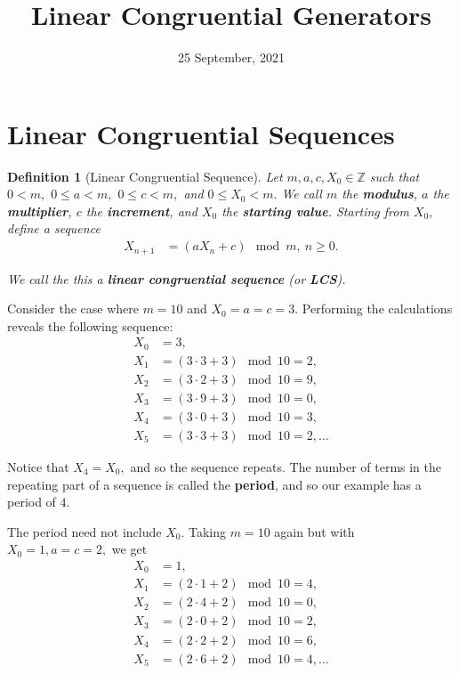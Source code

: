 \documentclass[11pt]{article}
\newcommand{\upright}[1]{{\bf \ttfamily #1}}
\newtheorem{definition}[theorem]{Definition}
\begin{document}
\title{Linear Congruential Generators}
\date{25 September, 2021}
\maketitle

\section{Linear Congruential Sequences}

\begin{definition}[Linear Congruential Sequence]\label{def:lcs}
Let $m, a, c, X_{0} \in \mathbb{Z}$ such that $0 < m,$ $0 \leq a< m,$ $0 \leq c < m,$ and $0 \leq X_{0} < m.$ We call $m$ the {\bf modulus}, $a$ the {\bf multiplier}, $c$ the {\bf increment}, and $X_{0}$ the {\bf starting value}. Starting from $X_{0},$ define a sequence
\begin{align}
\label{eqn:lcs}
X_{n+1} &= \left(a X_{n} + c\right) \mod m,~n\geq 0.
\end{align}

We call the this a {\bf linear congruential sequence} (or \upright{LCS}).
\end{definition}

Consider the case where $m = 10$ and $X_{0} = a = c = 3.$ Performing the calculations reveals the following sequence:
\begin{align*}
X_{0} &= 3,\\
X_{1} &= \left(3 \cdot 3 + 3\right) \mod 10 = 2,\\
X_{2} &= \left(3 \cdot 2 + 3\right) \mod 10 = 9,\\
X_{3} &= \left(3 \cdot 9 + 3\right) \mod 10 = 0,\\
X_{4} &= \left(3 \cdot 0 + 3\right) \mod 10 = 3,\\
X_{5} &= \left(3 \cdot 3 + 3\right) \mod 10 = 2,\ldots
\end{align*}

Notice that $X_{4} = X_{0},$ and so the sequence repeats. The number of terms in the repeating part of a sequence is called the {\bf period}, and so our example has a period of $4$.

The period need not include $X_{0}$. Taking $m = 10$ again but with $X_{0} = 1, a = c = 2,$ we get
\begin{align*}
X_{0} &= 1,\\
X_{1} &= \left(2 \cdot 1 + 2\right) \mod 10 = 4,\\
X_{2} &= \left(2 \cdot 4 + 2\right) \mod 10 = 0,\\
X_{3} &= \left(2 \cdot 0 + 2\right) \mod 10  = 2,\\
X_{4} &= \left(2 \cdot 2 + 2\right) \mod 10  = 6,\\
X_{5} &= \left(2 \cdot 6 + 2\right) \mod 10 = 4,\ldots
\end{align*}
\end{document}
